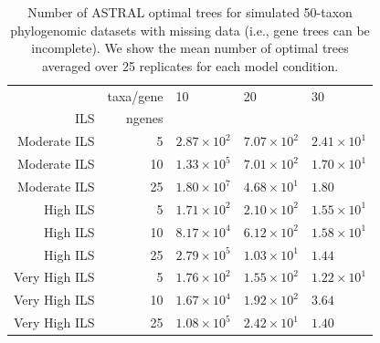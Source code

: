 \begin{table}
\centering

\begin{tabular}{|rr|lll|}
 
\hline
 &taxa/gene & 10 & 20 & 30\\
ILS&ngenes&&&\\



\hline 
\hline

Moderate ILS&5&	$2.87\times 10^{2}$	&$7.07\times 10^{2}$	&$2.41\times 10^{1}$\\
Moderate ILS&10&	$1.33\times 10^{5}$	&$7.01\times 10^{2}$	&$1.70\times 10^{1}$\\
Moderate ILS&25&	$1.80\times 10^{7}$	&$4.68\times 10^{1}$	&$1.80$\\
\hline
High ILS&5&	$1.71\times 10^{2}$	&$2.10\times 10^{2}$	&$1.55\times 10^{1}$\\
High ILS&10&	$8.17\times 10^{4}$	&$6.12\times 10^{2}$	&$1.58\times 10^{1}$\\
High ILS&25&	$2.79\times 10^{5}$	&$1.03\times 10^{1}$	&$1.44$\\
\hline
Very High ILS&5&	$1.76\times 10^{2}$	&$1.55\times 10^{2}$	&$1.22\times 10^{1}$\\
Very High ILS&10&	$1.67\times 10^{4}$	&$1.92\times 10^{2}$	&$3.64$\\
Very High ILS&25&	$1.08\times 10^{5}$	&$2.42\times 10^{1}$	&$1.40$\\
\hline
\end{tabular}


\caption[Number of ASTRAL optimal trees for simulated
  50-taxon phylogenomic datasets with missing data]{Number of ASTRAL optimal trees for simulated
  50-taxon phylogenomic datasets with missing data (i.e., gene trees can be incomplete). We show the mean number
  of optimal trees averaged over 25 replicates for each model condition.} \label{tab:astral-supertree_counts}
\end{table}


\newpage

\clearpage

